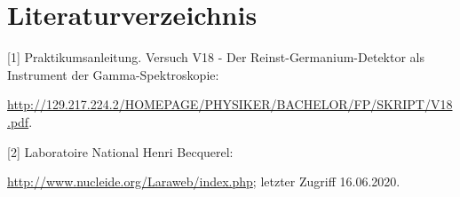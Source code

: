 \section{Literaturverzeichnis}
\label{sec:Diskussion}

[1] Praktikumsanleitung. Versuch V18 - Der Reinst-Germanium-Detektor als Instrument
der Gamma-Spektroskopie:

\url{http://129.217.224.2/HOMEPAGE/PHYSIKER/BACHELOR/FP/SKRIPT/V18.pdf}.

[2] Laboratoire National Henri Becquerel:

\url{http://www.nucleide.org/Laraweb/index.php}; letzter Zugriff 16.06.2020.
